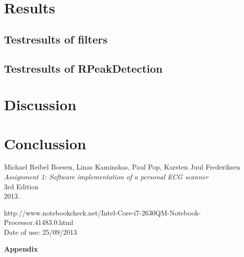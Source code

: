 \documentclass[12pt,a4paper]{article}
\begin{document}
\section{Results}
\subsection{Testresults of filters}

\begin{figure}[h!]
\end{figure}
\subsection{Testresults of RPeakDetection}

\section{Discussion}

\section{Conclussion}

\newpage
\begin{thebibliography}{9}

  Michael Reibel Boesen, Linas Kaminskas, Paul Pop, Karsten Juul Frederiksen\\
  \emph{Assignment 1: Software implementation of a personal ECG scanner}\\
  3rd Edition\\
  2013.

	http://www.notebookcheck.net/Intel-Core-i7-2630QM-Notebook-Processor.41483.0.html\\
	Date of use: 25/09/2013
\end{thebibliography}
	
\newpage	
	\begin{Large}
		\textbf{Appendix}
	\end{Large}
	\appendix
\end{document}
